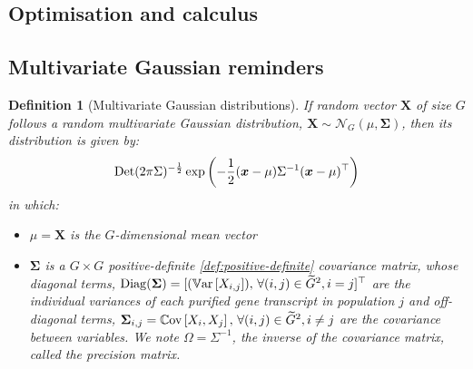 \documentclass[pdflatex, sn-nature]{sn-jnl}
\theoremstyle{thmstyleone}%
\theoremstyle{thmstyletwo}%
\theoremstyle{thmstylethree}%
\newtheorem{definition}{Definition}%
\begin{document}
\begin{appendices}
        \section{Optimisation and calculus}

        \subsection{Multivariate Gaussian reminders}
        \label{subsec:ols-assumptions}

        \begin{definition}[Multivariate Gaussian distributions]
            \label{def:multivariate-gaussian} If random vector $\boldsymbol{X}$ of
            size $G$ follows a random multivariate Gaussian distribution,
            $\boldsymbol{X}\sim \mathcal{N}_{G}(\mu, \boldsymbol{\Sigma})$, then
            its distribution is given by:
            \begin{equation*}
                \operatorname*{Det}(2\pi\Sigma)^{-\frac{1}{2}}\exp\left( -\frac{1}{2}(\boldsymbol
                {x}- \mu) \Sigma^{-1}(\boldsymbol{x}- \mu)^{\top}\right)
            \end{equation*}
            in which:
            \begin{itemize}
                \item $\mu=\boldsymbol{X}$ is the $G$-dimensional mean vector

                \item $\boldsymbol{\Sigma}$ is a $G\times G$ positive-definite \ref{def:positive-definite}
                    covariance matrix, whose diagonal terms, $\operatorname*{Diag}(\boldsymbol{\Sigma}
                    )=[(\operatorname*{\mathbb{V}\text{ar}}\left[{X_{i,j}}\right]), \, \forall (i, j) \in \widetilde{G}^{2}, i
                    = j]^{\top}$ are the individual variances of each purified gene
                    transcript in population $j$ and off-diagonal terms,
                    $\boldsymbol{\Sigma}_{i,j}=\operatorname*{\mathbb{C}\text{ov}}\left[{X_{i}, X_{j}}\right], \, \forall (i,
                    j) \in \widetilde{G}^{2}, i \neq j$
                    are the covariance between variables. We note $\Omega=\Sigma^{-1}$,
                    the inverse of the covariance matrix, called the \textit{precision
                    matrix}.
            \end{itemize}
        \end{definition}


\end{appendices}
\end{document}
